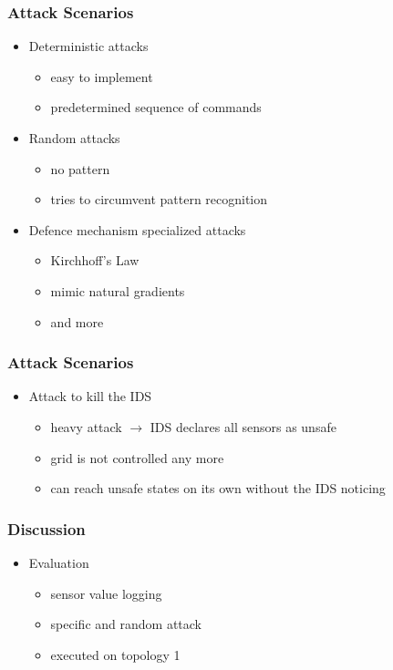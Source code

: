 \documentclass{beamer}
\begin{document}
\begin{frame}
	\frametitle{Attack Scenarios}
	\begin{itemize}
		\item Deterministic attacks
			\begin{itemize}
				\item easy to implement
				\item predetermined sequence of commands
			\end{itemize}
		\pause
		\item Random attacks
			\begin{itemize}
				\item no pattern
				\item tries to circumvent pattern recognition
			\end{itemize}
		\pause
		\item Defence mechanism specialized attacks
			\begin{itemize}
				\item Kirchhoff's Law
				\item mimic natural gradients
				\item and more
			\end{itemize}
	\end{itemize}
\end{frame}

\begin{frame}
	\frametitle{Attack Scenarios}
	\begin{itemize}
		\item Attack to kill the IDS
			\begin{itemize}
				\item heavy attack $\rightarrow$ IDS declares all sensors as unsafe
				\item grid is not controlled any more
				\item can reach unsafe states on its own without the IDS noticing
			\end{itemize}
	\end{itemize}
\end{frame}

\begin{frame}
	\frametitle{Discussion}
	\begin{itemize}
		\item Evaluation
			\begin{itemize}
				\item sensor value logging
				\item specific and random attack
				\item executed on topology 1
			\end{itemize}
	\end{itemize}
\end{frame}
\end{document}

